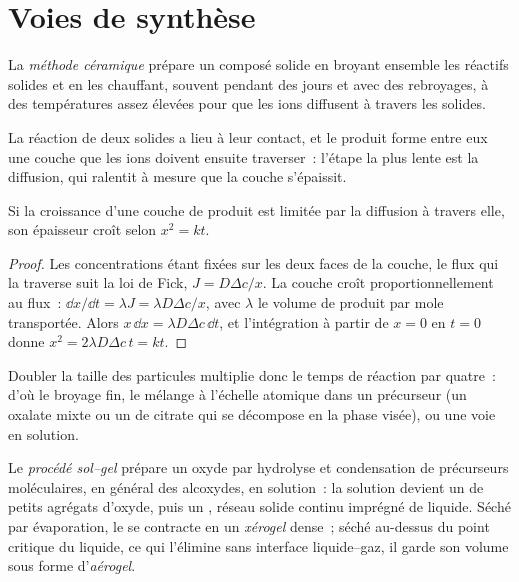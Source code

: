 \section{Voies de synthèse}

\begin{definition}\label{def:b3:inorganic-materials:ceramic-method}
La \emph{méthode céramique} prépare un composé solide en
broyant ensemble les réactifs solides et en les chauffant, souvent pendant
des jours et avec des rebroyages, à des températures assez élevées pour que
les ions diffusent à travers les solides.
\end{definition}

La réaction de deux solides a lieu à leur contact, et le produit forme
entre eux une couche que les ions doivent ensuite traverser~: l'étape la
plus lente est la diffusion, qui ralentit à mesure que la couche
s'épaissit.

\begin{proposition}\label{prop:b3:inorganic-materials:parabolic}
Si la croissance d'une couche de produit est limitée par la diffusion à
travers elle, son épaisseur croît selon $x^2 = kt$.
\end{proposition}

\begin{proof}
Les concentrations étant fixées sur les deux faces de la couche, le flux qui
la traverse suit la loi de Fick, $J = D\Delta c/x$. La couche croît proportionnellement au flux~:
$\dd x/\dd t = \lambda J = \lambda D\Delta c/x$, avec $\lambda$ le volume de produit par mole transportée. Alors
$x\,\dd x = \lambda D\Delta c\,\dd t$, et l'intégration à partir de $x = 0$ en $t = 0$ donne $x^2 = 2\lambda D\Delta c\,t = kt$.
\end{proof}

Doubler la taille des particules multiplie donc le temps de réaction par
quatre~: d'où le broyage fin, le mélange à l'échelle atomique dans un
précurseur (un oxalate mixte ou un  de citrate qui se décompose en la
phase visée), ou une voie en solution.

\begin{definition}\label{def:b3:inorganic-materials:sol-gel}
Le \emph{procédé sol--gel} prépare un oxyde par
hydrolyse et condensation de précurseurs moléculaires, en général des
alcoxydes, en solution~: la solution devient un  de petits agrégats
d'oxyde, puis un , réseau solide continu imprégné de liquide. Séché par
évaporation, le  se contracte en un \emph{xérogel} dense~; séché
au-dessus du point critique du liquide, ce qui l'élimine sans interface
liquide--gaz, il garde son volume sous forme d'\emph{aérogel}.
\end{definition}

